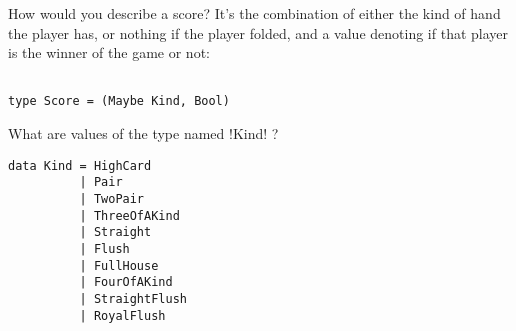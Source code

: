 \lhN How would you describe a score?
\lhA It's the combination of either the kind of hand the player has, or nothing if the player folded, and a value denoting if that player is the winner of the game or not: 
\begin{lstlisting}[] 

type Score = (Maybe Kind, Bool)

\end{lstlisting}

\lhN What are values of the type named \il!Kind! ?
\lhA 
\begin{lstlisting}[] 
data Kind = HighCard
          | Pair
          | TwoPair
          | ThreeOfAKind
          | Straight
          | Flush
          | FullHouse
          | FourOfAKind
          | StraightFlush
          | RoyalFlush

\end{lstlisting}


\lhend
